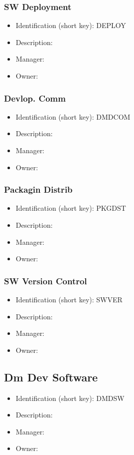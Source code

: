 \subsubsection{SW Deployment}\label{sect:DEPLOY}
\begin{itemize}
\item Identification (short key): DEPLOY
\item Description: 
\item Manager: 
\item Owner: 
\end{itemize}

\subsubsection{Devlop. Comm}\label{sect:DMDCOM}
\begin{itemize}
\item Identification (short key): DMDCOM
\item Description: 
\item Manager: 
\item Owner: 
\end{itemize}

\subsubsection{Packagin Distrib}\label{sect:PKGDST}
\begin{itemize}
\item Identification (short key): PKGDST
\item Description: 
\item Manager: 
\item Owner: 
\end{itemize}

\subsubsection{SW Version Control}\label{sect:SWVER}
\begin{itemize}
\item Identification (short key): SWVER
\item Description: 
\item Manager: 
\item Owner: 
\end{itemize}

\subsection{Dm Dev Software}\label{sect:DMDSW}
\begin{itemize}
\item Identification (short key): DMDSW
\item Description: 
\item Manager: 
\item Owner: 
\end{itemize}

